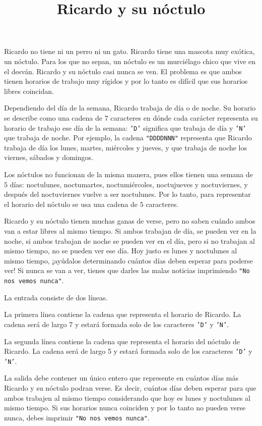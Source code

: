 \documentclass{oci}
\title{Ricardo y su nóctulo}
\begin{document}
\begin{problemDescription}
Ricardo no tiene ni un perro ni un gato.
%
Ricardo tiene una mascota muy exótica, un nóctulo.
%
Para los que no sepan, un nóctulo es un murciélago chico que
vive en el desván.
%
Ricardo y su nóctulo casi nunca se ven.
%
El problema es que ambos tienen horarios de trabajo
muy rígidos y por lo tanto es difícil que sus
horarios libres coincidan.

Dependiendo del día de la semana, Ricardo trabaja de día o de noche.
%
Su horario se describe como una cadena de $7$ caracteres en dónde cada
carácter representa su horario de trabajo ese día de la semana:
\texttt{'D'} significa que trabaja de día y \texttt{'N'} que trabaja de noche.
%
Por ejemplo, la cadena \texttt{"DDDDNNN"} representa que
Ricardo trabaja de día los lunes, martes, miércoles y jueves,
y que trabaja de noche los viernes, sábados y domingos.

Los nóctulos no funcionan de la misma manera, pues
ellos tienen una semana de $5$ días: noctulunes,
noctumartes, noctumiércoles, noctujueves y noctuviernes,
y después del noctuviernes vuelve a ser noctulunes.
%
Por lo tanto, para representar el horario del nóctulo se usa
una cadena de $5$ caracteres.

Ricardo y su nóctulo tienen muchas ganas de verse, pero no
saben cuándo ambos van a estar libres al mismo tiempo.
%
Si ambos trabajan de día, se pueden ver en la noche, si ambos
trabajan de noche se pueden ver en el día, pero si no trabajan
al mismo tiempo, no se pueden ver ese día.
%
Hoy justo es lunes y noctulunes al mismo tiempo,
%
¡ayúdalos determinando cuántos días deben esperar para poderse ver!
%
Si nunca se van a ver, tienes que darles las malas noticias imprimiendo
\texttt{"No nos vemos nunca"}.
\end{problemDescription}

\begin{inputDescription}
La entrada consiste de dos líneas.

La primera línea contiene la cadena que representa el horario de Ricardo.
%
La cadena será de largo 7 y estará formada solo de los caracteres \texttt{'D'}
y \texttt{'N'}.

La segunda línea contiene la cadena que representa el horario del nóctulo de
Ricardo.
%
La cadena será de largo 5 y estará formada solo de los caracteres \texttt{'D'}
y \texttt{'N'}.
\end{inputDescription}

\begin{outputDescription}
La salida debe contener un único entero que represente en cuántos días más Ricardo y su nóctulo
podran verse.
%
Es decir, cuántos días deben esperar para que ambos trabajen al mismo tiempo
considerando que hoy es lunes y noctulunes al mismo tiempo.
%
Si sus horarios nunca coinciden y por lo tanto no pueden verse nunca, debes
imprimir \texttt{"No nos vemos nunca"}.
\end{outputDescription}
\end{document}
